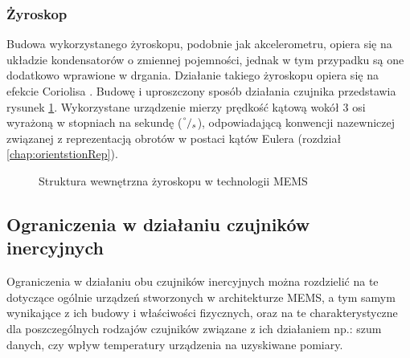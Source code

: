	\subsubsection*{Żyroskop}
	Budowa wykorzystanego żyroskopu, podobnie jak akcelerometru, opiera się na układzie kondensatorów o zmiennej pojemności, jednak w tym przypadku są one dodatkowo wprawione w drgania. Działanie takiego żyroskopu opiera się na efekcie Coriolisa \cite{memsAccIdea2016}. Budowę i uproszczony sposób działania czujnika przedstawia rysunek \ref{fig:characteristics:imu:gyro:mems}. Wykorzystane urządzenie mierzy prędkość kątową wokół 3 osi wyrażoną w stopniach na sekundę ($^\degree/_s$), odpowiadającą konwencji nazewniczej związanej z reprezentacją obrotów w postaci kątów Eulera (rozdział \ref{chap:orientstionRep}). 
		
	\begin{figure}[!htp]
					
		\caption{Struktura wewnętrzna żyroskopu w technologii MEMS}
		\label{fig:characteristics:imu:gyro:mems}
	\end{figure}
		
	\subsection{Ograniczenia w działaniu czujników inercyjnych}
	Ograniczenia w działaniu obu czujników inercyjnych można rozdzielić na te dotyczące ogólnie urządzeń stworzonych w architekturze MEMS, a tym samym wynikające z ich budowy i właściwości fizycznych, oraz na te charakterystyczne dla poszczególnych rodzajów czujników związane z ich działaniem np.: szum danych, czy wpływ temperatury urządzenia na uzyskiwane pomiary.
		
